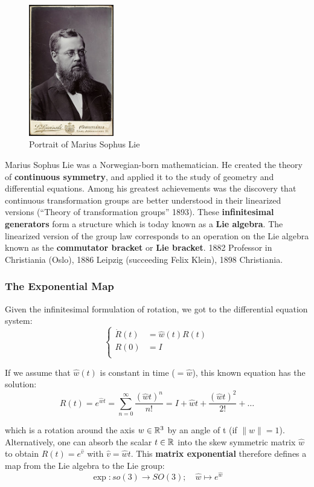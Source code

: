 \begin{figure}[ht]
\centering
\includegraphics[width=10em]{assets/img/sophus_lie.jpg}
\caption*{Portrait of Marius Sophus Lie}
\end{figure}

Marius Sophus Lie was a Norwegian-born mathematician.
He created the theory of \textbf{continuous symmetry}, and applied it to
the study of geometry and differential equations. Among his greatest
achievements was the discovery that continuous transformation
groups are better understood in their linearized versions
(``Theory of transformation groups'' 1893).
These \textbf{infinitesimal generators} form a structure which is today
known as a \textbf{Lie algebra}. The linearized version of the group law
corresponds to an operation on the Lie algebra known as
the \textbf{commutator bracket} or \textbf{Lie bracket}.
1882 Professor in Christiania (Oslo),
1886 Leipzig (succeeding Felix Klein),
1898 Christiania.


\subsubsection{The Exponential Map}%
\label{ssub:the_exponential_map}

Given the infinitesimal formulation of rotation,
we got to the differential equation system:
	\[\left\{ \begin{aligned}
		\dot{R}(t) &= \widehat{w}(t)R(t) \\
		R(0) &= I \\
	\end{aligned}\right.\]

If we assume that $\widehat{w}(t)$ is constant in time ($=\widehat{w}$),
this known equation has the solution:
	\[R(t) = e^{\widehat{w}t}
		= \sum_{n=0}^{\infty} \frac{{(\widehat{w}t)}^n }{n!}
		= I + \widehat{w}t + \frac{{(\widehat{w}t)}^2 }{2!} + \ldots \]

which is a rotation around the axis $w \in \mathbb{R}^3$
by an angle of t (if $\|w\| = 1$). Alternatively, one can absorb
the scalar $t \in \mathbb{R}$ into the skew  symmetric matrix $\widehat{w}$
to obtain $R(t) = e^{\widehat{v}}$ with $\widehat{v} = \widehat{w}t$.
This \textbf{matrix exponential} therefore defines a map from
the Lie algebra to the Lie group:
	\[\exp : so(3) \rightarrow SO(3);\quad \widehat{w}\mapsto e^{\widehat{w}}\]


